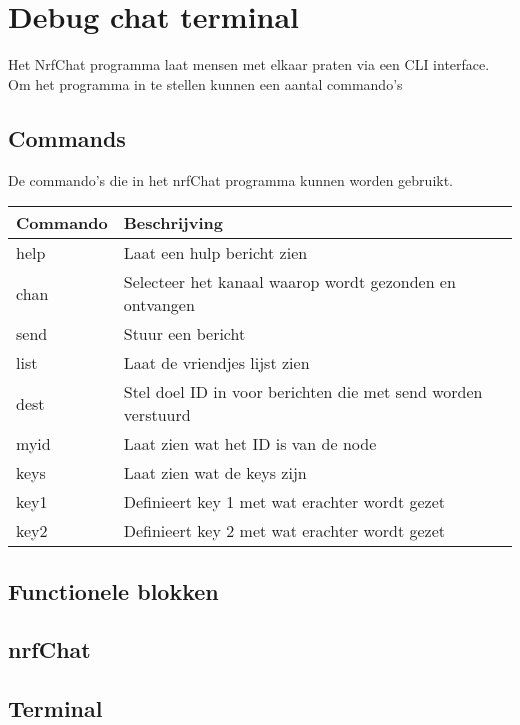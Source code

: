 \section{Debug chat terminal} \label{sec:debugProgram}

Het NrfChat programma laat mensen met elkaar praten via een CLI interface. Om het programma in te stellen kunnen een aantal commando's

\subsection{Commands}
De commando's die in het nrfChat programma kunnen worden gebruikt.

\begin{table}[h]
    \begin{tabular}{|l|l|} \hline
        \textbf{Commando} & \textbf{Beschrijving} \\\hline
        help & Laat een hulp bericht zien \\\hline
        chan & Selecteer het kanaal waarop wordt gezonden en ontvangen\\\hline
        send & Stuur een bericht \\\hline
        list & Laat de vriendjes lijst zien\\\hline
        dest & Stel doel ID in voor berichten die met send worden verstuurd \\\hline
        myid & Laat zien wat het ID is van de node \\\hline
        keys & Laat zien wat de keys zijn \\\hline
        key1 & Definieert key 1 met wat erachter wordt gezet\\\hline
        key2 & Definieert key 2 met wat erachter wordt gezet\\\hline
    \end{tabular}
\end{table}

\subsection{Functionele blokken}

\subsection{nrfChat}
    

\subsection{Terminal}
    
    

    